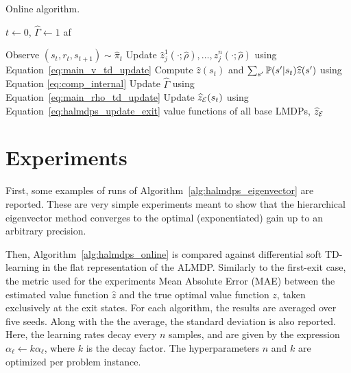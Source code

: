 \begin{algorithm}[!htpb]
  \caption{Online algorithm.}
  \begin{algorithmic}[1]
    \State $t \gets 0$, $\widehat{\Gamma} \gets 1$
    \State af

    \State Observe $(s_{t}, r_{t}, s_{t+1})\sim\widehat\pi_t$
    \State Update $\widehat z_j^1(\cdot;\widehat\rho),\ldots,\widehat z_j^n(\cdot;\widehat\rho)$ using Equation~\eqref{eq:main_v_td_update}
    \State Compute $\widehat z(s_t)$ and $\sum_{s'}\mathbb{P}(s'|s_t)\widehat z(s')$ using Equation \eqref{eq:comp_internal}
    \State Update $\widehat\Gamma$ using Equation~\eqref{eq:main_rho_td_update}
    \State Update $\widehat z_{\mathcal{E}}(s_t)$ using Equation~\eqref{eq:halmdps_update_exit}
    \EndIf
    \EndWhile
    \State \Return value functions of all base LMDPs, ${\widehat z_{\mathcal{E}}}$

  \end{algorithmic}
  \label{alg:halmdps_online}
\end{algorithm}

\section{Experiments}

First, some examples of runs of Algorithm~\ref{alg:halmdps_eigenvector} are reported. These are very simple experiments meant to show that the hierarchical eigenvector method converges to the optimal (exponentiated) gain up to an arbitrary precision.

Then, Algorithm~\ref{alg:halmdps_online} is compared against differential soft TD-learning in the flat representation of the ALMDP. Similarly to the first-exit case, the metric used for the experiments Mean Absolute Error (MAE) between the estimated value function $\widehat z$ and the true optimal value function $z$, taken exclusively at the exit states. For each algorithm, the results are averaged over five seeds. Along with the the average, the standard deviation is also reported. Here, the learning rates decay every $n$ samples, and are given by the expression $\alpha_\ell \leftarrow k \alpha_\ell$, where $k$ is the decay factor. The hyperparameters $n$ and $k$ are optimized per problem instance.

